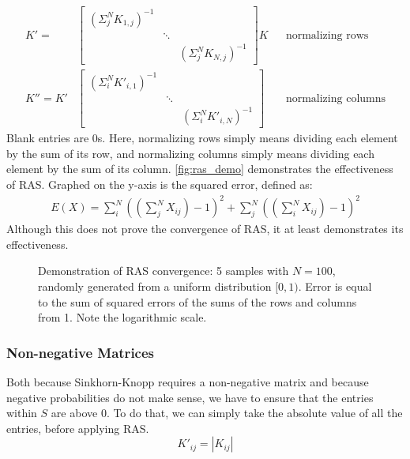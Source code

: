 \begin{align*}
        K'=&\begin{bmatrix}
                (\Sigma_j^N K_{1,j})^{-1}\\
                &\ddots{}\\
                &&(\Sigma_j^N K_{N,j})^{-1}
        \end{bmatrix}K &&\text{normalizing rows}\\
                K''=K'&\begin{bmatrix}
                (\Sigma_i^N K'_{i,1})^{-1}\\
                &\ddots{}\\
                &&(\Sigma_i^N K'_{i,N})^{-1}
        \end{bmatrix}&&\text{normalizing columns}
\end{align*}
Blank entries are $0$s. Here, normalizing rows simply means dividing each element by the sum of its row, and normalizing columns simply means dividing each element by the sum of its column. \autoref{fig:ras_demo} demonstrates the effectiveness of RAS. Graphed on the y-axis is the squared error, defined as:
\begin{align*}
        E(X)=\sum^N_i\left(\left(\sum^N_jX_{ij}\right)-1\right)^2+\sum^N_j\left(\left(\sum^N_iX_{ij}\right)-1\right)^2
\end{align*}
Although this does not prove the convergence of RAS, it at least demonstrates its effectiveness.

\begin{figure}[htpb]
        \centering
        
        \caption{Demonstration of RAS convergence: 5 samples with $N=100$, randomly generated from a uniform distribution $[0,1)$. Error is equal to the sum of squared errors of the sums of the rows and columns from 1. Note the logarithmic scale.}%
        \label{fig:ras_demo}
\end{figure}


\subsubsection{Non-negative Matrices}%
\label{ssub:non_negative_matrices}
Both because Sinkhorn-Knopp requires a non-negative matrix and because negative probabilities do not make sense, we have to ensure that the entries within $S$ are above  $0$. To do that, we can simply take the absolute value of all the entries, before applying RAS.
\begin{equation}
K'_{ij}=|K_{ij}|
\end{equation}

